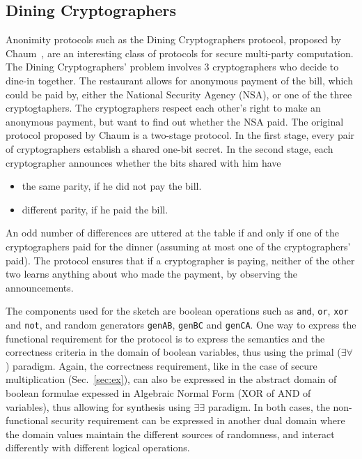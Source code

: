 \documentclass[preprint]{sig-alternate-05-2015}
\begin{document}
\subsection{Dining Cryptographers}

Anonimity protocols such as the Dining Cryptographers protocol,
proposed by Chaum~\cite{Chaum88}, are an interesting class of protocols for secure
multi-party computation.
The Dining Cryptographers' problem involves 3 cryptographers who decide to
dine-in together. The restaurant allows for anonymous payment of the bill,
which could be paid by, either the National Security Agency (NSA),
or one of the three cryptogtaphers.
The cryptographers respect each other's right to make an anonymous payment, 
but want to find out whether the NSA paid.
The original protocol proposed by Chaum is a two-stage protocol.
In the first stage, every pair of cryptographers establish 
a shared one-bit secret. 
In the second stage, each cryptographer announces 
whether the bits shared with him have
\begin{itemize}
    \item the same parity, if he did not pay the bill.
    \item different parity, if he paid the bill.
\end{itemize}
An odd number of differences are uttered at the table if and only if
one of the cryptographers paid for the dinner (assuming at most 
one of the cryptographers' paid).
The protocol ensures that if a cryptographer is paying, 
neither of the other two learns anything about who made the payment, 
by observing the announcements.

The components used for the sketch are boolean operations such as \texttt{and},
\texttt{or}, \texttt{xor} and \texttt{not}, and random generators \texttt{genAB},
\texttt{genBC} and \texttt{genCA}.
One way to express the functional requirement for the protocol is to 
express the semantics and the correctness criteria in the domain of boolean variables,
thus using the primal ($\exists \forall$) paradigm.
Again, the correctness requirement, like in the case of secure 
multiplication (Sec.~\ref{sec:ex}), can also be expressed in the
abstract domain of boolean formulae expessed in Algebraic Normal Form 
(XOR of AND of variables), thus allowing for synthesis using $\exists \exists$
paradigm.
In both cases, the non-functional security requirement
can be expressed in another dual domain where the domain values
maintain the different sources of randomness, 
and interact differently with different logical operations.
\end{document}
